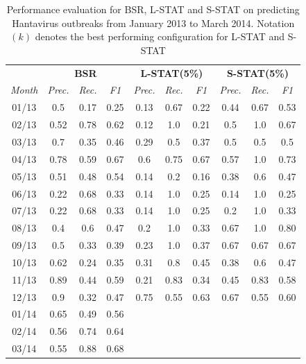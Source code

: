 \documentclass[conference]{IEEEtran}
\newcommand{\fullmodel}{{S-STAT}\xspace}
\newcommand{\locationmodel}{{L-STAT}\xspace}
\begin{document}
\begin{table}[h]
\scriptsize
  \caption{Performance evaluation for BSR, \locationmodel and \fullmodel on predicting Hantavirus outbreaks from January 2013 to March 2014. Notation $(k)$ denotes the best performing configuration for \locationmodel and \fullmodel}
  \begin{tabular}{|c|c|c|c|c|c|c|c|c|c|}
    \hline
    & \multicolumn{3}{c|}{{\bf BSR}} &
    \multicolumn{3}{c|}{{\bf \locationmodel(5\%)}} &
    \multicolumn{3}{c|}{{\bf \fullmodel(5\%)}} \\
    \cline{2-10} {\em Month}   & {\em Prec.} & {\em Rec.} & {\em F1} & {\em Prec.} & {\em Rec.} & {\em F1} & {\em Prec.} & {\em Rec.} & {\em F1} \\
    \hline 
    01/13 & 0.5 & 0.17 & 0.25 & 0.13 & 0.67 & 0.22 & 0.44 & 0.67 & 0.53\\ 
    \hline
     02/13 & 0.52 & 0.78 & 0.62 & 0.12 & 1.0 & 0.21 & 0.5 & 1.0 & 0.67\\ 
    \hline
    03/13 & 0.7 & 0.35 & 0.46 & 0.29 & 0.5 & 0.37 & 0.5 & 0.5 & 0.5\\ 
    \hline
    04/13 & 0.78 & 0.59 & 0.67 & 0.6 & 0.75 & 0.67 & 0.57 & 1.0 & 0.73\\ 
    \hline
    05/13 & 0.51 & 0.48 & 0.54 & 0.14 & 0.2 & 0.16 & 0.38 & 0.6 & 0.47\\ 
    \hline
    06/13 & 0.22 & 0.68 & 0.33 & 0.14 & 1.0 & 0.25 & 0.14 & 1.0 & 0.25\\ 
    \hline
    07/13 & 0.22 & 0.68 & 0.33 & 0.14 & 1.0 & 0.25 & 0.2 & 1.0 & 0.33\\ 
    \hline
    08/13 & 0.4 & 0.6 & 0.47 & 0.2 & 1.0 & 0.33 & 0.67 & 1.0 & 0.80\\ 
    \hline
    09/13 & 0.5 & 0.33 & 0.39 & 0.23 & 1.0 & 0.37 & 0.67 & 0.67 & 0.67\\ 
    \hline
    10/13 & 0.62 & 0.24 & 0.35 & 0.31 & 0.8 & 0.45 & 0.38 & 0.6 & 0.47\\ 
    \hline
    11/13 & 0.89 & 0.44 & 0.59 & 0.21 & 0.83 & 0.34 & 0.45 & 0.83 & 0.58\\ 
    \hline
    12/13 & 0.9 & 0.32 & 0.47 & 0.75 & 0.55 & 0.63 & 0.67 & 0.55 & 0.60\\ 
    \hline
    01/14 & 0.65 & 0.49 & 0.56 &  &  &  &  &  & \\ 
    \hline
    02/14 & 0.56 & 0.74 & 0.64 &  &  &  & & & \\ 
    \hline
    03/14 & 0.55 & 0.88 & 0.68 &  &  &  & & & \\ 
    \hline

  \end{tabular}
  \label{tab:results}
\end{table}
\end{document}
